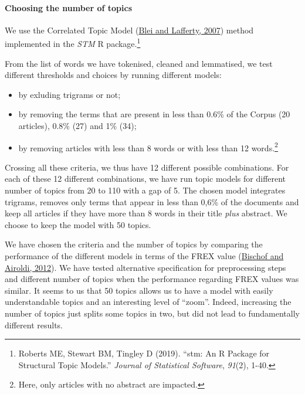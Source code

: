 \documentclass[
  12pt,
  onecolumn]{article}
\providecommand{\tightlist}{%
  \setlength{\itemsep}{0pt}\setlength{\parskip}{0pt}}
\begin{document}
\hypertarget{choosing-the-number-of-topics}{%
\paragraph*{Choosing the number of
topics}\label{choosing-the-number-of-topics}}

We use the Correlated Topic Model (\protect\hyperlink{ref-blei2007}{Blei
and Lafferty, 2007}) method implemented in the \emph{STM} R
package.\footnote{Roberts ME, Stewart BM, Tingley D (2019). ``stm: An R
  Package for Structural Topic Models.'' \emph{Journal of Statistical
  Software}, \emph{91}(2), 1-40.}

From the list of words we have tokenised, cleaned and lemmatised, we
test different thresholds and choices by running different models:

\begin{itemize}
\tightlist
\item
  by exluding trigrams or not;
\item
  by removing the terms that are present in less than 0.6\% of the
  Corpus (20 articles), 0.8\% (27) and 1\% (34);
\item
  by removing articles with less than 8 words or with less than 12
  words.\footnote{Here, only articles with no abstract are impacted.}
\end{itemize}

Crossing all these criteria, we thus have 12 different possible
combinations. For each of these 12 different combinations, we have run
topic models for different number of topics from 20 to 110 with a gap of
5. The chosen model integrates trigrams, removes only terms that appear
in less than 0,6\% of the documents and keep all articles if they have
more than 8 words in their title \emph{plus} abstract. We choose to keep
the model with 50 topics.

We have chosen the criteria and the number of topics by comparing the
performance of the different models in terms of the FREX value
(\protect\hyperlink{ref-bischof2012}{Bischof and Airoldi, 2012}). We
have tested alternative specification for preprocessing steps and
different number of topics when the performance regarding FREX values
was similar. It seems to us that 50 topics allows us to have a model
with easily understandable topics and an interesting level of ``zoom''.
Indeed, increasing the number of topics just splits some topics in two,
but did not lead to fundamentally different results.
\end{document}
